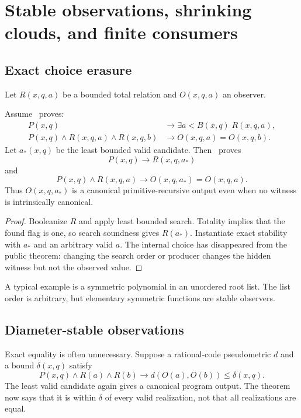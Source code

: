 \section{Stable observations, shrinking clouds, and finite consumers}\label{sec:observations}

\subsection{Exact choice erasure}

Let \(R(x,q,a)\) be a bounded total relation and \(O(x,q,a)\) an observer.

\begin{theorem}\label{thm:stable-exact}
Assume \iPRA\ proves:
\begin{align*}
 P(x,q)&\longrightarrow \exists a<B(x,q)\;R(x,q,a),\\
 P(x,q)\wedge R(x,q,a)\wedge R(x,q,b)&\longrightarrow O(x,q,a)=O(x,q,b).
\end{align*}
Let \(a_*(x,q)\) be the least bounded valid candidate.  Then \iPRA\ proves
\[
 P(x,q)\longrightarrow R(x,q,a_*)
\]
and
\[
 P(x,q)\wedge R(x,q,a)\longrightarrow O(x,q,a_*)=O(x,q,a).
\]
Thus \(O(x,q,a_*)\) is a canonical primitive-recursive output even when no witness is intrinsically canonical.
\end{theorem}

\begin{proof}
Booleanize \(R\) and apply least bounded search.  Totality implies that the found flag is one, so search soundness gives \(R(a_*)\).  Instantiate exact stability with \(a_*\) and an arbitrary valid \(a\).  The internal choice has disappeared from the public theorem: changing the search order or producer changes the hidden witness but not the observed value.
\end{proof}

A typical example is a symmetric polynomial in an unordered root list.  The list order is arbitrary, but elementary symmetric functions are stable observers.

\subsection{Diameter-stable observations}

Exact equality is often unnecessary.  Suppose a rational-code pseudometric \(d\) and a bound \(\delta(x,q)\) satisfy
\[
 P(x,q)\wedge R(a)\wedge R(b)
 \longrightarrow d(O(a),O(b))\le\delta(x,q).
\]
The least valid candidate again gives a canonical program output.  The theorem now says that it is within \(\delta\) of every valid realization, not that all realizations are equal.

